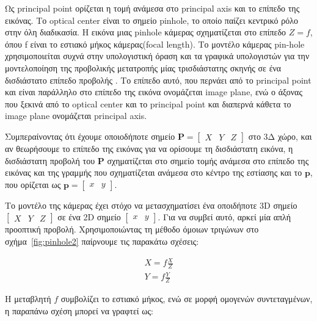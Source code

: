 Ως principal point ορίζεται η τομή ανάμεσα στο principal axis και το επίπεδο της εικόνας. Το optical center είναι το σημείο pinhole, το οποίο παίζει κεντρικό ρόλο στην όλη διαδικασία. Η εικόνα μιας pinhole κάμερας σχηματίζεται στο επίπεδο $Z=f$, όπου f είναι το εστιακό μήκος κάμερας(focal length).
Το μοντέλο κάμερας pin-hole χρησιμοποιείται συχνά στην υπολογιστική όραση και τα γραφικά υπολογιστών για την μοντελοποίηση της προβολικής μετατροπής μίας τρισδιάστατης σκηνής σε ένα δισδιάστατο επίπεδο προβολής \cite{hartley2003multiple} .
Το επίπεδο αυτό, που περνάει από το principal point και είναι παράλληλο στο επίπεδο της εικόνα ονομάζεται image plane, ενώ ο άξονας που ξεκινά από το optical center και το principal point και διαπερνά κάθετα το image plane ονομάζεται principal axis.


Συμπεραίνοντας ότι έχουμε οποιοδήποτε σημείο $\mathbf{P} = \begin{bmatrix}X & Y &Z\end{bmatrix}$ στο 3Δ χώρο, και αν θεωρήσουμε το επίπεδο της εικόνας για να ορίσουμε τη δισδιάστατη εικόνα, η δισδιάστατη προβολή του $\mathbf{P}$ σχηματίζεται στο σημείο τομής ανάμεσα στο επίπεδο της εικόνας και της γραμμής που σχηματίζεται ανάμεσα στο κέντρο της εστίασης και το $\mathbf{p}$, που ορίζεται ως  $\mathbf{p} = \begin{bmatrix}x & y\end{bmatrix}$. 





Το μοντέλο της κάμερας έχει στόχο να μετασχηματίσει ένα οποιδήποτε 3D σημείο $\begin{bmatrix} X & Y & Z \end{bmatrix}$ σε ένα 2D σημείο $\begin{bmatrix} x & y\end{bmatrix}$. Για να συμβεί αυτό, αρκεί μία απλή προοπτική προβολή. Χρησιμοποιώντας τη μέθοδο όμοιων τριγώνων στο σχήμα~\ref{fig:pinhole2} παίρνουμε τις παρακάτω σχέσεις:


\begin{equation}
\begin{aligned}
X=f\frac{X}{Z}\\[0.2cm] 
Y=f\frac{Y}{Z}
\end{aligned}
\end{equation}


Η μεταβλητή $f$ συμβολίζει το εστιακό μήκος, ενώ σε μορφή ομογενών συντεταγμένων, η παραπάνω σχέση μπορεί να γραφτεί ως:


